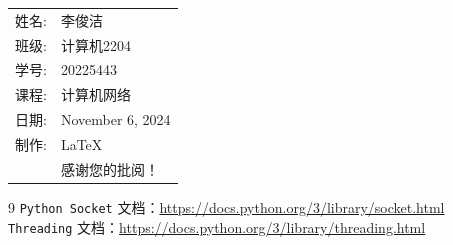 \documentclass[12pt]{article}
\begin{document}
\begin{flushright}
\begin{tabular}{rl}
    姓名: & 李俊洁\\
    班级: & 计算机2204 \\
    学号: & 20225443 \\
    课程: & 计算机网络 \\
    日期: & November 6, 2024 \\
    制作: & \LaTeX \\
    & 感谢您的批阅！
\end{tabular}
\end{flushright}

\begin{thebibliography}{9}
 \texttt{Python Socket} 文档：\url{https://docs.python.org/3/library/socket.html}
 \texttt{Threading} 文档：\url{https://docs.python.org/3/library/threading.html}
\end{thebibliography}
\end{document}
